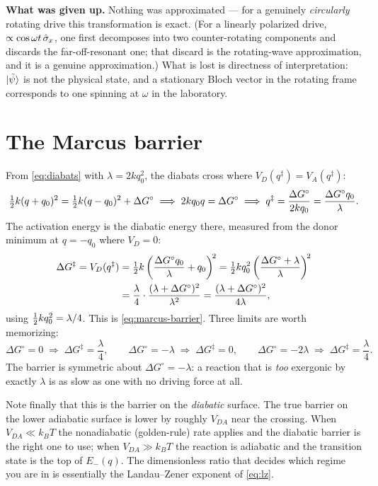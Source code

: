 \noindent
\textbf{What was given up.} Nothing was approximated --- for a genuinely
\emph{circularly} rotating drive this transformation is exact. (For a linearly polarized
drive, $\propto\cos\omega t\,\hat{\sigma}_x$, one first decomposes into two counter-rotating
components and discards the far-off-resonant one; that discard is the rotating-wave
approximation, and it is a genuine approximation.) What is lost is directness of
interpretation: $\ket{\tilde\psi}$ is not the physical state, and a stationary Bloch
vector in the rotating frame corresponds to one spinning at $\omega$ in the laboratory.

\section{The Marcus barrier}
\label{app:marcus}

From \cref{eq:diabats} with $\lambda = 2kq_0^2$, the diabats cross where
$V_D(q^\ddagger)=V_A(q^\ddagger)$:
%
\begin{equation}
\tfrac{1}{2} k(q+q_0)^2 = \tfrac{1}{2} k(q-q_0)^2 + \Delta G^\circ
\;\Longrightarrow\;
2kq_0 q = \Delta G^\circ
\;\Longrightarrow\;
q^{\ddagger} = \frac{\Delta G^\circ}{2kq_0} = \frac{\Delta G^\circ q_0}{\lambda}.
\end{equation}
%
The activation energy is the diabatic energy there, measured from the donor minimum at
$q=-q_0$ where $V_D=0$:
%
\begin{align}
\Delta G^{\ddagger} = V_D(q^{\ddagger})
 &= \tfrac{1}{2} k\left(\frac{\Delta G^\circ q_0}{\lambda} + q_0\right)^{\!2}
  = \tfrac{1}{2} k q_0^2\left(\frac{\Delta G^\circ+\lambda}{\lambda}\right)^{\!2} \nonumber\\
 &= \frac{\lambda}{4}\cdot\frac{(\lambda+\Delta G^\circ)^2}{\lambda^2}
  = \frac{(\lambda+\Delta G^{\circ})^2}{4\lambda},
\end{align}
%
using $\tfrac{1}{2} k q_0^2 = \lambda/4$. This is \cref{eq:marcus-barrier}. Three limits are
worth memorizing:
%
\begin{equation}
\Delta G^\circ = 0 \;\Rightarrow\; \Delta G^\ddagger = \frac{\lambda}{4},
\qquad
\Delta G^\circ = -\lambda \;\Rightarrow\; \Delta G^\ddagger = 0,
\qquad
\Delta G^\circ = -2\lambda \;\Rightarrow\; \Delta G^\ddagger = \frac{\lambda}{4}.
\end{equation}
%
The barrier is symmetric about $\Delta G^\circ=-\lambda$: a reaction that is
\emph{too} exergonic by exactly $\lambda$ is as slow as one with no driving force at all.

Note finally that this is the barrier on the \emph{diabatic} surface. The true barrier on
the lower adiabatic surface is lower by roughly $V_{DA}$ near the crossing. When
$V_{DA}\ll k_BT$ the nonadiabatic (golden-rule) rate applies and the diabatic barrier is
the right one to use; when $V_{DA}\gg k_BT$ the reaction is adiabatic and the transition
state is the top of $E_-(q)$. The dimensionless ratio that decides which regime you are
in is essentially the Landau--Zener exponent of \cref{eq:lz}.
